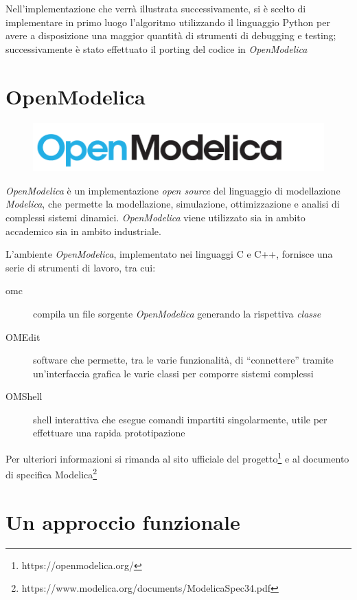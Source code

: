 \documentclass[11pt,a4paper]{report}
\begin{document}
Nell'implementazione che verrà illustrata successivamente, si è scelto di implementare in primo luogo l'algoritmo utilizzando il linguaggio Python per avere a disposizione una maggior quantità di strumenti di debugging e testing; successivamente è stato effettuato il porting del codice in \textit{OpenModelica}

\section{OpenModelica}

\begin{figure}[H]
\centering
\includegraphics[scale=0.5]{openmodelica.png}
\end{figure}

\textit{OpenModelica} è un implementazione \textit{open source} del linguaggio di modellazione \textit{Modelica}, che permette la modellazione, simulazione, ottimizzazione e analisi di complessi sistemi dinamici. \textit{OpenModelica} viene utilizzato sia in ambito accademico sia in ambito industriale.

L'ambiente \textit{OpenModelica}, implementato nei linguaggi C e C++, fornisce una serie di strumenti di lavoro, tra cui:

\begin{description}
	\item[omc] compila un file sorgente \textit{OpenModelica} generando la rispettiva \textit{classe}
	\item[OMEdit] software che permette, tra le varie funzionalità, di ``connettere'' tramite un'interfaccia grafica le varie classi per comporre sistemi complessi
	\item[OMShell] shell interattiva che esegue comandi impartiti singolarmente, utile per effettuare una rapida prototipazione
\end{description}

Per ulteriori informazioni si rimanda al sito ufficiale del progetto\footnote{https://openmodelica.org/} e al documento di specifica Modelica\footnote{https://www.modelica.org/documents/ModelicaSpec34.pdf}

\section{Un approccio funzionale}
\end{document}
